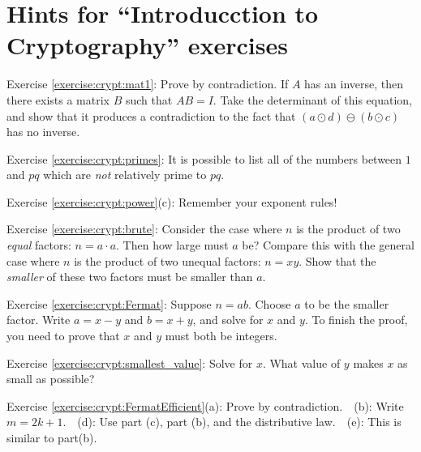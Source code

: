\section{Hints for ``Introducction to Cryptography'' exercises}\label{sec:crypt:hints}

\noindent Exercise \ref{exercise:crypt:mat1}: Prove by contradiction.  If $A$ has an inverse, then there exists a matrix $B$ such that $AB = I$.  Take the determinant of this equation, and show that it produces a contradiction to the fact that $(a \odot d)  \ominus (b \odot c)$ has no inverse.

\noindent Exercise \ref{exercise:crypt:primes}: It is possible to list all of the numbers between $1$ and $pq$ which are \emph{not} relatively prime to $pq$.

\noindent Exercise \ref{exercise:crypt:power}(c): Remember your exponent rules!

\noindent Exercise \ref{exercise:crypt:brute}: Consider the case where $n$ is the product of two \emph{equal} factors:  $n=a \cdot a$. Then how large must $a$ be?  Compare this with the general case where $n$ is the product of two unequal factors:  $n = xy$. Show that the \emph{smaller} of these two factors must be smaller than $a$.

\noindent Exercise \ref{exercise:crypt:Fermat}: Suppose $n=ab$. Choose $a$ to be the smaller factor.  Write $a = x-y$ and $b = x+y$, and solve for $x$ and $y$. To finish the proof, you need to prove that $x$ and $y$ must both be integers.

\noindent Exercise \ref{exercise:crypt:smallest_value}: Solve for $x$. What value of $y$ makes $x$ as small as possible?

\noindent Exercise \ref{exercise:crypt:FermatEfficient}(a): Prove by contradiction.~~(b): Write $m = 2k+1$.~~(d): Use part (c), part (b), and the distributive law.~~(e): This is similar to part(b).